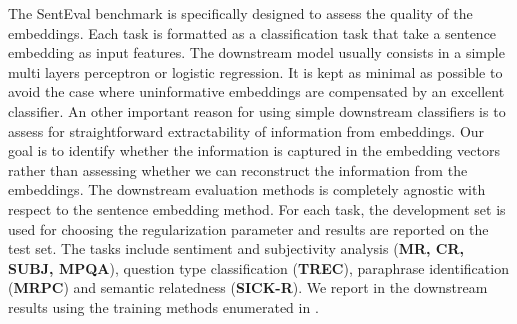 The SentEval benchmark \parencite{conneau_18} is specifically designed to assess the quality of the embeddings. Each task is formatted as a classification task that take a sentence embedding as input features. The downstream model usually consists in a simple multi layers perceptron or logistic regression. It is kept as minimal as possible to avoid the case where uninformative embeddings are compensated by an excellent classifier. An other important reason for using simple downstream classifiers is to assess for straightforward extractability of information from embeddings. Our goal is to identify whether the information is captured in the embedding vectors rather than assessing whether we can reconstruct the information from the embeddings. The downstream evaluation methods is completely agnostic with respect to the sentence embedding method. For each task, the development set is used for choosing the regularization parameter and results are reported on the test set. The tasks include sentiment and subjectivity analysis (\textbf{MR, CR, SUBJ, MPQA}), question type classification (\textbf{TREC}), paraphrase identification (\textbf{MRPC}) and semantic relatedness (\textbf{SICK-R}). We report in  the downstream results using the training methods enumerated in .

